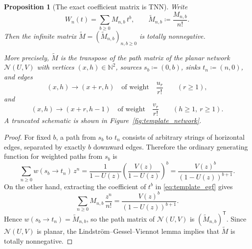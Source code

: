 \documentclass[11pt,reqno]{amsart}
\newtheorem{proposition}[theorem]{Proposition}
\theoremstyle{definition}
\newcommand{\setN}{\mathbb{N}}
\begin{document}
\begin{proposition}[The exact coefficient matrix is TNN]\label{prop:template_tnn}
Write
\[
  W_n(t)=\sum_{b\geq 0} M_{n,b}\,t^b,
  \qquad
  \widetilde M_{n,b}\coloneqq \frac{M_{n,b}}{n!}.
\]
Then the infinite matrix \(\widetilde M=(\widetilde M_{n,b})_{n,b\geq 0}\) is
totally nonnegative.

More precisely, \(\widetilde M\) is the transpose of the path matrix of the
planar network \(\mathcal N(U,V)\) with vertices \((x,h)\in \setN^2\), sources
\(s_b\coloneqq (0,b)\), sinks \(t_n\coloneqq (n,0)\), and edges
\[
  (x,h)\to (x+r,h)
  \quad\text{of weight}\quad
  \frac{u_r}{r!}
  \qquad (r\geq 1),
\]
and
\[
  (x,h)\to (x+r,h-1)
  \quad\text{of weight}\quad
  \frac{v_r}{r!}
  \qquad (h\geq 1,\ r\geq 1).
\]
A truncated schematic is shown in Figure~\ref{fig:template_network}.
\end{proposition}

\begin{proof}
For fixed \(b\), a path from \(s_b\) to \(t_n\) consists of arbitrary strings
of horizontal edges, separated by exactly \(b\) downward edges. Therefore the
ordinary generating function for weighted paths from \(s_b\) is
\[
  \sum_{n\geq 0} w(s_b\to t_n)\,z^n
  =
  \frac{1}{1-U(z)}
  \left(\frac{V(z)}{1-U(z)}\right)^b
  =
  \frac{V(z)^b}{(1-U(z))^{b+1}}.
\]
On the other hand, extracting the coefficient of \(t^b\) in
\eqref{eq:template_egf} gives
\[
  \sum_{n\geq 0} M_{n,b}\,\frac{z^n}{n!}
  =
  \frac{V(z)^b}{(1-U(z))^{b+1}}.
\]
Hence \(w(s_b\to t_n)=\widetilde M_{n,b}\), so the path matrix of
\(\mathcal N(U,V)\) is \((\widetilde M_{n,b})^\mathsf{T}\). Since
\(\mathcal N(U,V)\) is planar, the Lindstr\"om--Gessel--Viennot lemma
\cite{Lindstrom1973,GesselViennot1985} implies that \(\widetilde M\) is
totally nonnegative.
\end{proof}
\end{document}
